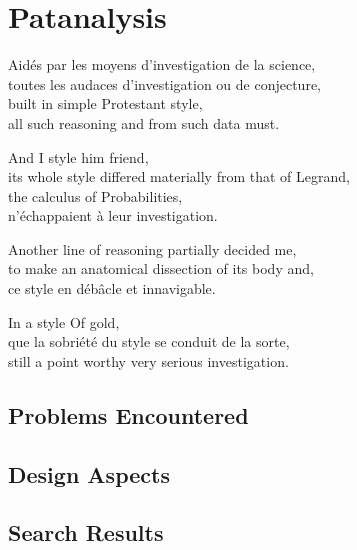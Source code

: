
\chapter{Patanalysis}
\label{ch:analysis}

\startcontents[chapters]

Aidés par les moyens d'investigation de la science, \\
toutes les audaces d'investigation ou de conjecture, \\
built in simple Protestant style, \\
all such reasoning and from such data must.

And I style him friend, \\
its whole style differed materially from that of Legrand, \\
the calculus of Probabilities, \\
n'échappaient à leur investigation.

Another line of reasoning partially decided me, \\
to make an anatomical dissection of its body and, \\
ce style en débâcle et innavigable.

In a style Of gold, \\
que la sobriété du style se conduit de la sorte, \\
still a point worthy very serious investigation.

\minicontents

\section{Problems Encountered}

\section{Design Aspects}

\section{Search Results}

\stopcontents[chapters]
